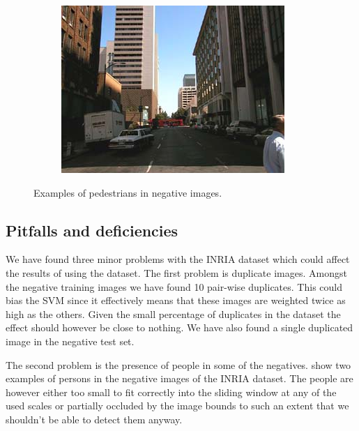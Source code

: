 \documentclass[thesis.tex]{subfiles}
\begin{document}
\begin{figure}[p]
{\begin{subfigure}[t]{0.593\textwidth}
	\end{subfigure}
	\begin{subfigure}[t]{0.593\textwidth}
		\includegraphics[width=\textwidth]{img/inriaManOccluded.png}
	\end{subfigure}
	}
	\caption{Examples of pedestrians in negative images.}
	\label{fig:inriaNegativePersons}
\end{figure}

\subsection{Pitfalls and deficiencies}
\label{sec:INRIApitfalls}
We have found three minor problems with the INRIA dataset which could affect the results of using the dataset. The first problem is duplicate images. Amongst the negative training images we have found 10 pair-wise duplicates. This could bias the SVM since it effectively means that these images are weighted twice as high as the others. Given the small percentage of duplicates in the dataset the effect should however be close to nothing. We have also found a single duplicated image in the negative test set.

The second problem is the presence of people in some of the negatives.
 show two examples of persons in the negative images of the INRIA dataset. The people are however either too small to fit correctly into the sliding window at any of the used scales or partially occluded by the image bounds to such an extent that we shouldn't be able to detect them anyway.
\end{document}
